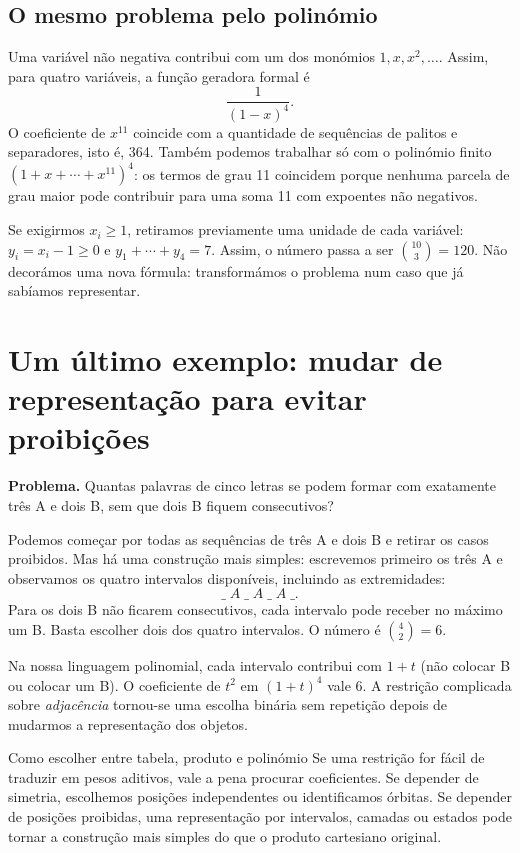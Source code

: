 \documentclass[11pt,a4paper,oneside]{book}
\begin{document}
\section{O mesmo problema pelo polinómio}
Uma variável não negativa contribui com um dos monómios $1,x,x^2,\ldots$. Assim, para quatro variáveis, a função geradora formal é
\[
\frac1{(1-x)^4}.
\]
O coeficiente de $x^{11}$ coincide com a quantidade de sequências de palitos e separadores, isto é, 364. Também podemos trabalhar só com o polinómio finito $(1+x+\cdots+x^{11})^4$: os termos de grau 11 coincidem porque nenhuma parcela de grau maior pode contribuir para uma soma 11 com expoentes não negativos.

Se exigirmos $x_i\ge1$, retiramos previamente uma unidade de cada variável: $y_i=x_i-1\ge0$ e $y_1+\cdots+y_4=7$. Assim, o número passa a ser $\binom{10}{3}=120$. Não decorámos uma nova fórmula: transformámos o problema num caso que já sabíamos representar.

\chapter{Um último exemplo: mudar de representação para evitar proibições}
\textbf{Problema.} Quantas palavras de cinco letras se podem formar com exatamente três A e dois B, sem que dois B fiquem consecutivos?

Podemos começar por todas as sequências de três A e dois B e retirar os casos proibidos. Mas há uma construção mais simples: escrevemos primeiro os três A e observamos os quatro intervalos disponíveis, incluindo as extremidades:
\[
\_\;A\;\_\;A\;\_\;A\;\_.
\]
Para os dois B não ficarem consecutivos, cada intervalo pode receber no máximo um B. Basta escolher dois dos quatro intervalos. O número é $\binom42=6$.

Na nossa linguagem polinomial, cada intervalo contribui com $1+t$ (não colocar B ou colocar um B). O coeficiente de $t^2$ em $(1+t)^4$ vale 6. A restrição complicada sobre \emph{adjacência} tornou-se uma escolha binária sem repetição depois de mudarmos a representação dos objetos.
\begin{descobertabox}{Como escolher entre tabela, produto e polinómio}
Se uma restrição for fácil de traduzir em pesos aditivos, vale a pena procurar coeficientes. Se depender de simetria, escolhemos posições independentes ou identificamos órbitas. Se depender de posições proibidas, uma representação por intervalos, camadas ou estados pode tornar a construção mais simples do que o produto cartesiano original.
\end{descobertabox}
\end{document}
